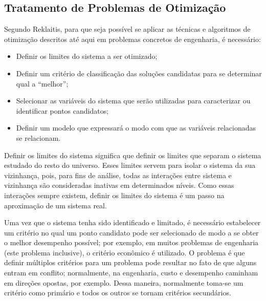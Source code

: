 \subsection{Tratamento de Problemas de Otimiza\c{c}\~{a}o}\label{sub:tratamento}
Segundo Reklaitis, para que seja poss\'{i}vel se aplicar as t\'{e}cnicas e algoritmos de otimiza\c{c}\~{a}o descritos at\'{e} aqui em problemas concretos de engenharia, \'{e} necess\'{a}rio:
\begin{itemize}
\item Definir os limites do sistema a ser otimizado;
\item Definir um crit\'{e}rio de classifica\c{c}\~{a}o das solu\c{c}\~{o}es candidatas para se determinar qual a ``melhor'';
\item Selecionar as vari\'{a}veis do sistema que ser\~{a}o utilizadas para caracterizar ou identificar pontos candidatos;
\item Definir um modelo que expressar\'{a} o modo com que as vari\'{a}veis relacionadas se relacionam.
\end{itemize}

Definir os limites do sistema significa que definir os limites que separam o sistema estudado do resto do universo. Esses limites servem para isolar o sistema da sua vizinhan\c{c}a, pois, para fins de an\'{a}lise, todas as intera\c{c}\~{o}es entre sistema e vizinhan\c{c}a s\~{a}o consideradas inativas em determinados n\'{i}veis. Como essas intera\c{c}\~{o}es sempre existem, definir os limites do sistema \'{e} um passo na aproxima\c{c}\~{a}o de um sistema real.

Uma vez que o sistema tenha sido identificado e limitado, \'{e} necess\'{a}rio estabelecer um crit\'{e}rio no qual um ponto candidato pode ser selecionado de modo a se obter o melhor desempenho poss\'{i}vel; por exemplo, em muitos problemas de engenharia (este problema inclusive), o crit\'{e}rio econ\^{o}mico \'{e} utilizado. O problema \'{e} que definir m\'{u}ltiplos crit\'{e}rios para um problema pode resultar no fato de que alguns entram em conflito; normalmente, na engenharia, custo e desempenho caminham em dire\c{c}\~{o}es opostas, por exemplo. Dessa maneira, normalmente toma-se um crit\'{e}rio como prim\'{a}rio e todos os outros se tornam crit\'{e}rios secund\'{a}rios.

